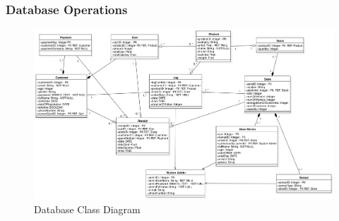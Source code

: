 \documentclass[11pt]{article}
\begin{document}
    \subsubsection{Database Operations}

    \begin{center}
        \begin{figure}[H]
            \includegraphics[width=\linewidth]{Images/DatabaseClassDiagram.png}
            \caption{Database Class Diagram}
            \label{dcd}
        \end{figure}
    \end{center}
\end{document}

